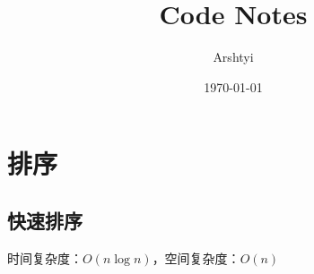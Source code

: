\documentclass{../../../Cls/Notebook/Code/Code}
\title{\Huge{Code Notes}}
\author{\huge{Arshtyi}}
\date{\today}
\newcommand{\fzd}[1]{\ensuremath{O\left(#1\right)}}
\newcommand{\code}[1]{}
\begin{document}
\maketitle
\newpage
{}
\setcounter{page}{1}
\pagestyle{plain}
\tableofcontents
\newpage
\setcounter{page}{1}
\pagestyle{fancy}
\fancyhf{}
\fancyhead[L]{\leftmark}
\fancyhead[R]{\thepage}
\section{排序}
\subsection{快速排序}
时间复杂度：\fzd{n \log n}，空间复杂度：\fzd{n}
\code{QuickSort}
\end{document}
